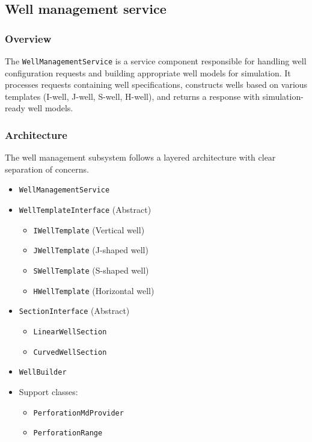 \subsection{Well management service}

\subsubsection{Overview}

The \texttt{WellManagementService} is a service component responsible for handling well configuration requests and building appropriate well models for simulation. It processes requests containing well specifications, constructs wells based on various templates (I-well, J-well, S-well, H-well), and returns a response with simulation-ready well models.

\subsubsection{Architecture}

The well management subsystem follows a layered architecture with clear separation of concerns.

\begin{itemize}
	\item \texttt{WellManagementService}
	\item \texttt{WellTemplateInterface} (Abstract)
	\begin{itemize}
		\item \texttt{IWellTemplate} (Vertical well)
		\item \texttt{JWellTemplate} (J-shaped well)
		\item \texttt{SWellTemplate} (S-shaped well)
		\item \texttt{HWellTemplate} (Horizontal well)
	\end{itemize}
	\item \texttt{SectionInterface} (Abstract)
	\begin{itemize}
		\item \texttt{LinearWellSection}
		\item \texttt{CurvedWellSection}
	\end{itemize}
	\item \texttt{WellBuilder}
	\item Support classes:
	\begin{itemize}
		\item \texttt{PerforationMdProvider}
		\item \texttt{PerforationRange}
	\end{itemize}
\end{itemize}

